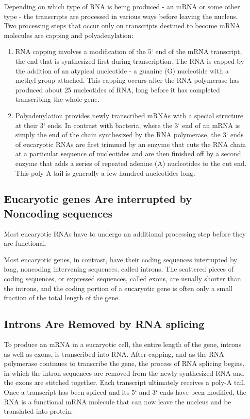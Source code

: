 Depending on which type of RNA is being produced - an mRNA or some
other type - the transcripts are processed in various ways before leaving
the nucleus. Two processing steps that occur only on transcripts destined
to become mRNA molecules are capping and polyadenylation:

\begin{enumerate}
\item RNA capping involves a modification of the 5` end of the mRNA
transcript, the end that is synthesized first during transcription. The
RNA is capped by the addition of an atypical nucleotide - a guanine
(G) nucleotide with a methyl group attached. This capping occurs
after the RNA polymerase has produced about 25 nucleotides of
RNA, long before it has completed transcribing the whole gene.
\item Polyadenylation provides newly transcribed mRNAs with a special
structure at their 3` ends. In contrast with bacteria, where the 3`
end of an mRNA is simply the end of the chain synthesized by the
RNA polymerase, the 3` ends of eucaryotic RNAs are first trimmed
by an enzyme that cuts the RNA chain at a particular sequence of
nucleotides and are then finished off by a second enzyme that adds
a series of repeated adenine (A) nucleotides to the cut end. This
poly-A tail is generally a few hundred nucleotides long.
\end{enumerate}

\subsection{Eucaryotic genes Are interrupted by Noncoding sequences}

Most eucaryotic RNAs have to undergo an additional processing step
before they are functional.

Most eucaryotic genes, in contrast, have their coding sequences interrupted
by long, noncoding intervening sequences, called introns. The scattered pieces
of coding sequences, or expressed sequences, called exons, are usually shorter than
the introns, and the coding portion of a eucaryotic gene is often only a
small fraction of the total length of the gene.

\subsection{Introns Are Removed by RNA splicing}

To produce an mRNA in a eucaryotic cell, the entire length of the gene,
introns as well as exons, is transcribed into RNA. After capping, and as
the RNA polymerase continues to transcribe the gene, the process of RNA
splicing begins, in which the intron sequences are removed from the
newly synthesized RNA and the exons are stitched together. Each transcript
ultimately receives a poly-A tail.
Once a transcript has been spliced and its 5` and
3` ends have been modified, the RNA is a functional mRNA molecule that
can now leave the nucleus and be translated into protein.

